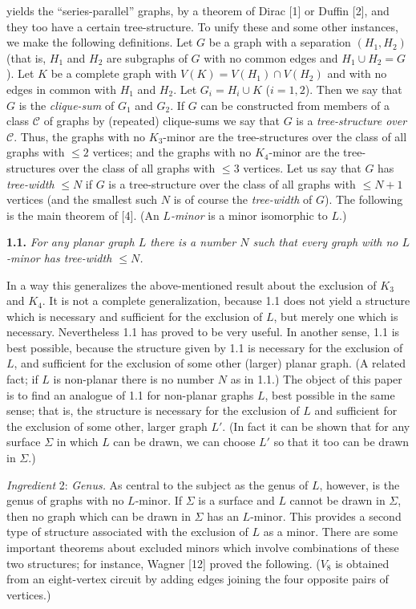 \noindent yields the ``series-parallel'' graphs, by a theorem of Dirac [1] or Duffin [2], and they too have a certain tree-structure. To unify these and some other instances, we make the following definitions. Let $G$ be a graph with a separation $(H_1, H_2)$ (that is, $H_1$ and $H_2$ are subgraphs of $G$ with no common edges and $H_1 \cup H_2 = G$). Let $K$ be a complete graph with $V(K) = V(H_1) \cap V(H_2)$ and with no edges in common with $H_1$ and $H_2$. Let $G_i = H_i \cup K$ ($i = 1, 2$). Then we say that $G$ is the \textit{clique-sum} of $G_1$ and $G_2$. If $G$ can be constructed from members of a class $\mathcal{C}$ of graphs by (repeated) clique-sums we say that $G$ is a \textit{tree-structure over} $\mathcal{C}$. Thus, the graphs with no $K_3$-minor are the tree-structures over the class of all graphs with $\le 2$ vertices; and the graphs with no $K_4$-minor are the tree-structures over the class of all graphs with $\le 3$ vertices. Let us say that $G$ has \textit{tree-width} $\le N$ if $G$ is a tree-structure over the class of all graphs with $\le N + 1$ vertices (and the smallest such $N$ is of course the \textit{tree-width} of $G$). The following is the main theorem of [4]. (An \textit{$L$-minor} is a minor isomorphic to $L$.)

\textbf{1.1.} \textit{For any planar graph $L$ there is a number $N$ such that every graph with no $L$-minor has tree-width $\le N$.}

In a way this generalizes the above-mentioned result about the exclusion of $K_3$ and $K_4$. It is not a complete generalization, because 1.1 does not yield a structure which is necessary and sufficient for the exclusion of $L$, but merely one which is necessary. Nevertheless 1.1 has proved to be very useful. In another sense, 1.1 is best possible, because the structure given by 1.1 is necessary for the exclusion of $L$, and sufficient for the exclusion of some other (larger) planar graph. (A related fact; if $L$ is non-planar there is no number $N$ as in 1.1.) The object of this paper is to find an analogue of 1.1 for non-planar graphs $L$, best possible in the same sense; that is, the structure is necessary for the exclusion of $L$ and sufficient for the exclusion of some other, larger graph $L'$. (In fact it can be shown that for any surface $\Sigma$ in which $L$ can be drawn, we can choose $L'$ so that it too can be drawn in $\Sigma$.)

\textit{Ingredient} 2: \textit{Genus.} As central to the subject as the genus of $L$, however, is the genus of graphs with no $L$-minor. If $\Sigma$ is a surface and $L$ cannot be drawn in $\Sigma$, then no graph which can be drawn in $\Sigma$ has an $L$-minor. This provides a second type of structure associated with the exclusion of $L$ as a minor. There are some important theorems about excluded minors which involve combinations of these two structures; for instance, Wagner [12] proved the following. ($V_8$ is obtained from an eight-vertex circuit by adding edges joining the four opposite pairs of vertices.)

